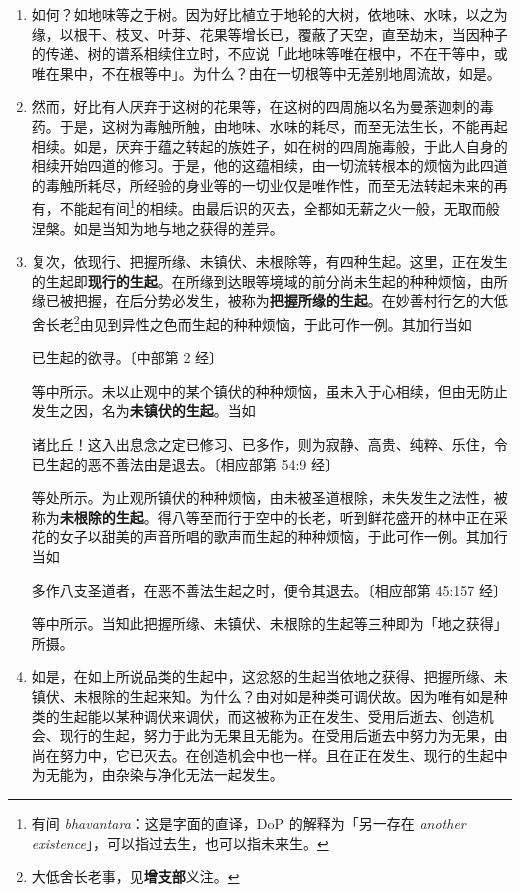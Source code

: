 \begin{enumerate}
\item 如何？如地味等之于树。因为好比植立于地轮的大树，依地味、水味，以之为缘，以根干、枝叉、叶芽、花果等增长已，覆蔽了天空，直至劫末，当因种子的传递、树的谱系相续住立时，不应说「此地味等唯在根中，不在干等中，或唯在果中，不在根等中」。为什么？由在一切根等中无差别地周流故，如是。
\item 然而，好比有人厌弃于这树的花果等，在这树的四周施以名为曼荼迦刺的毒药。于是，这树为毒触所触，由地味、水味的耗尽，而至无法生长，不能再起相续。如是，厌弃于蕴之转起的族姓子，如在树的四周施毒般，于此人自身的相续开始四道的修习。于是，他的这蕴相续，由一切流转根本的烦恼为此四道的毒触所耗尽，所经验的身业等的一切业仅是唯作性，而至无法转起未来的再有，不能起有间\footnote{有间 \textit{bhavantara}：这是字面的直译，DoP 的解释为「另一存在 \textit{another existence}」，可以指过去生，也可以指未来生。}的相续。由最后识的灭去，全都如无薪之火一般，无取而般涅槃。如是当知为地与地之获得的差异。
\item 复次，依现行、把握所缘、未镇伏、未根除等，有四种生起。这里，正在发生的生起即\textbf{现行的生起}。在所缘到达眼等境域的前分尚未生起的种种烦恼，由所缘已被把握，在后分势必发生，被称为\textbf{把握所缘的生起}。在妙善村行乞的大低舍长老\footnote{大低舍长老事，见\textbf{增支部}义注。}由见到异性之色而生起的种种烦恼，于此可作一例。其加行当如\begin{quoting}已生起的欲寻。{\bluefootnotesize 〔中部第 2 经〕}\end{quoting}等中所示。未以止观中的某个镇伏的种种烦恼，虽未入于心相续，但由无防止发生之因，名为\textbf{未镇伏的生起}。当如\begin{quoting}诸比丘！这入出息念之定已修习、已多作，则为寂静、高贵、纯粹、乐住，令已生起的恶不善法由是退去。{\bluefootnotesize 〔相应部第 54:9 经〕}\end{quoting}等处所示。为止观所镇伏的种种烦恼，由未被圣道根除，未失发生之法性，被称为\textbf{未根除的生起}。得八等至而行于空中的长老，听到鲜花盛开的林中正在采花的女子以甜美的声音所唱的歌声而生起的种种烦恼，于此可作一例。其加行当如\begin{quoting}多作八支圣道者，在恶不善法生起之时，便令其退去。{\bluefootnotesize 〔相应部第 45:157 经〕}\end{quoting}等中所示。当知此把握所缘、未镇伏、未根除的生起等三种即为「地之获得」所摄。
\item 如是，在如上所说品类的生起中，这忿怒的生起当依地之获得、把握所缘、未镇伏、未根除的生起来知。为什么？由对如是种类可调伏故。因为唯有如是种类的生起能以某种调伏来调伏，而这被称为正在发生、受用后逝去、创造机会、现行的生起，努力于此为无果且无能为。在受用后逝去中努力为无果，由尚在努力中，它已灭去。在创造机会中也一样。且在正在发生、现行的生起中为无能为，由杂染与净化无法一起发生。

\end{enumerate}
